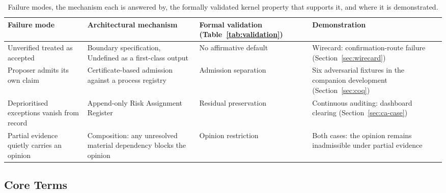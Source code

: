 \documentclass[11pt,a4paper]{article}
\theoremstyle{definition}
\theoremstyle{remark}
\begin{document}
\begin{table}[htbp]
\centering
\small
\begin{tabular}{>{\raggedright\arraybackslash}p{2.8cm}>{\raggedright\arraybackslash}p{3.2cm}>{\raggedright\arraybackslash}p{3.2cm}>{\raggedright\arraybackslash}p{3.4cm}}
\toprule
\textbf{Failure mode} & \textbf{Architectural mechanism} & \textbf{Formal validation (Table~\ref{tab:validation})} & \textbf{Demonstration} \\
\midrule
Unverified treated as accepted & Boundary specification, \textsf{Undefined} as a first-class output & No affirmative default & Wirecard: confirmation-route failure (Section~\ref{sec:wirecard}) \\
\addlinespace
Proposer admits its own claim & Certificate-based admission against a process registry & Admission separation & Six adversarial fixtures in the companion development (Section~\ref{sec:coq}) \\
\addlinespace
Deprioritised exceptions vanish from record & Append-only Risk Assignment Register & Residual preservation & Continuous auditing: dashboard clearing (Section~\ref{sec:ca-case}) \\
\addlinespace
Partial evidence quietly carries an opinion & Composition: any unresolved material dependency blocks the opinion & Opinion restriction & Both cases: the opinion remains inadmissible under partial evidence \\
\bottomrule
\end{tabular}
\caption{Failure modes, the mechanism each is answered by, the formally validated kernel property that supports it, and where it is demonstrated.}
\label{tab:dsrmap}
\end{table}

\subsection*{Core Terms}
\end{document}
